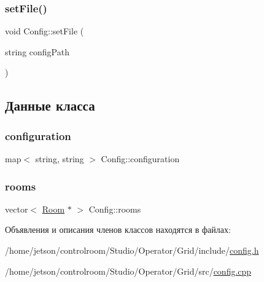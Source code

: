\mbox{\label{class_config_a06542bc14d3414c075a9cbb04f1e9a37}} 
\subsubsection{\texorpdfstring{set\+File()}{setFile()}\hspace{0.1cm}{\footnotesize\ttfamily [2/2]}}
{\footnotesize\ttfamily void Config\+::set\+File (\begin{DoxyParamCaption}\item[{string}]{config\+Path }\end{DoxyParamCaption})}



\subsection{Данные класса}
\mbox{\label{class_config_a0b04d0c5fab98d257b2cf28cab895a3c}} 
\subsubsection{\texorpdfstring{configuration}{configuration}}
{\footnotesize\ttfamily map$<$ string, string $>$ Config\+::configuration\hspace{0.3cm}{\ttfamily [private]}}

\mbox{\label{class_config_a13e9d9cfc3a9de64415d2674c6ecaf5c}} 
\subsubsection{\texorpdfstring{rooms}{rooms}}
{\footnotesize\ttfamily vector$<$ \hyperlink{class_room}{Room} $\ast$ $>$ Config\+::rooms\hspace{0.3cm}{\ttfamily [private]}}



Объявления и описания членов классов находятся в файлах\+:\begin{DoxyCompactItemize}
\item 
/home/jetson/controlroom/\+Studio/\+Operator/\+Grid/include/\hyperlink{_operator_2_grid_2include_2config_8h}{config.\+h}\item 
/home/jetson/controlroom/\+Studio/\+Operator/\+Grid/src/\hyperlink{_operator_2_grid_2src_2config_8cpp}{config.\+cpp}\end{DoxyCompactItemize}
